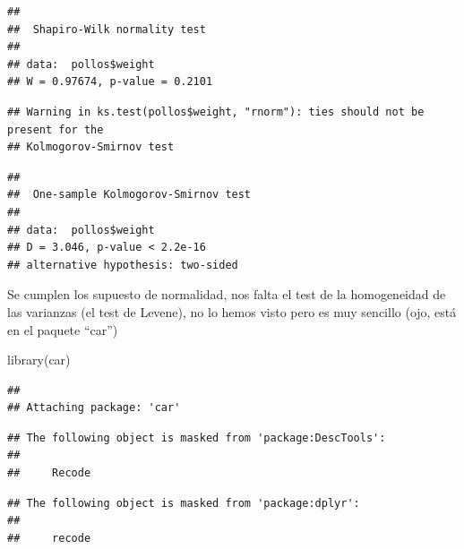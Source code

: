 \documentclass[
]{book}
\newenvironment{Shaded}{\begin{snugshade}}{\end{snugshade}}
\newcommand{\DocumentationTok}[1]{\textcolor[rgb]{0.56,0.35,0.01}{\textbf{\textit{#1}}}}
\newcommand{\FunctionTok}[1]{\textcolor[rgb]{0.00,0.00,0.00}{#1}}
\newcommand{\NormalTok}[1]{#1}
\newcommand{\SpecialCharTok}[1]{\textcolor[rgb]{0.00,0.00,0.00}{#1}}
\newcommand{\StringTok}[1]{\textcolor[rgb]{0.31,0.60,0.02}{#1}}
\begin{document}
\begin{Shaded}
\end{Shaded}

\begin{verbatim}
## 
##  Shapiro-Wilk normality test
## 
## data:  pollos$weight
## W = 0.97674, p-value = 0.2101
\end{verbatim}

\begin{Shaded}
\end{Shaded}

\begin{verbatim}
## Warning in ks.test(pollos$weight, "rnorm"): ties should not be present for the
## Kolmogorov-Smirnov test
\end{verbatim}

\begin{verbatim}
## 
##  One-sample Kolmogorov-Smirnov test
## 
## data:  pollos$weight
## D = 3.046, p-value < 2.2e-16
## alternative hypothesis: two-sided
\end{verbatim}

Se cumplen los supuesto de normalidad, nos falta el test de la homogeneidad de las varianzas (el test de Levene), no lo hemos visto pero es muy sencillo (ojo, está en el paquete ``car'')

\begin{Shaded}
\begin{Highlighting}[]
\FunctionTok{library}\NormalTok{(car)}
\end{Highlighting}
\end{Shaded}

\begin{verbatim}
## 
## Attaching package: 'car'
\end{verbatim}

\begin{verbatim}
## The following object is masked from 'package:DescTools':
## 
##     Recode
\end{verbatim}

\begin{verbatim}
## The following object is masked from 'package:dplyr':
## 
##     recode
\end{verbatim}
\end{document}
